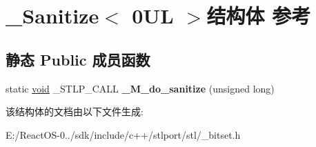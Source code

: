 \hypertarget{struct___sanitize_3_010_u_l_01_4}{}\section{\+\_\+\+Sanitize$<$ 0\+UL $>$结构体 参考}
\label{struct___sanitize_3_010_u_l_01_4}
\subsection*{静态 Public 成员函数}
\begin{DoxyCompactItemize}
\item 
\mbox{\label{struct___sanitize_3_010_u_l_01_4_a79752e4434754fa55d383084803674c3}} 
static \hyperlink{interfacevoid}{void} \+\_\+\+S\+T\+L\+P\+\_\+\+C\+A\+LL {\bfseries \+\_\+\+M\+\_\+do\+\_\+sanitize} (unsigned long)
\end{DoxyCompactItemize}


该结构体的文档由以下文件生成\+:\begin{DoxyCompactItemize}
\item 
E\+:/\+React\+O\+S-\/0../sdk/include/c++/stlport/stl/\+\_\+bitset.\+h\end{DoxyCompactItemize}
